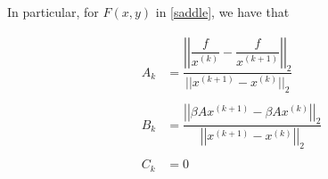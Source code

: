 In particular, for $F(x,y)$ in \eqref{saddle}, we have that

\begin{align*}
A_k &= \dfrac{\left|\left|\dfrac{f}{x^{(k)}} - \dfrac{f}{x^{(k+1)}}\right|\right|_2}{||x^{(k+1)}-x^{(k)}||_2} \\
\\
B_k &= \dfrac{\left|\left|\beta Ax^{(k+1)} - \beta A x^{(k)}\right|\right|_2}{\left|\left|x^{(k+1)}-x^{(k)}\right|\right|_2} \\
\\
C_k &= 0
\end{align*}



